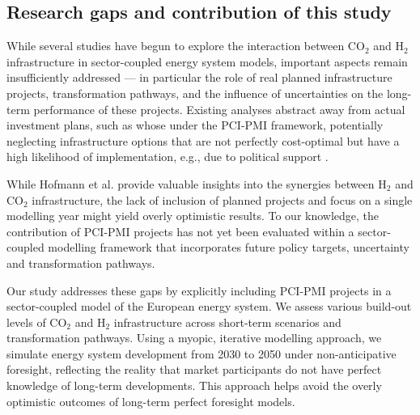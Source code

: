 \documentclass[pdflatex,sn-nature]{sn-jnl}%
\theoremstyle{thmstyleone}%
\theoremstyle{thmstyletwo}%
\theoremstyle{thmstylethree}%
\begin{document}
\subsection{Research gaps and contribution of this study}\label{sec:research_gaps_contribution}
While several studies have begun to explore the interaction between CO$_2$ and H$_2$ infrastructure in sector-coupled energy system models, important aspects remain insufficiently addressed --- in particular the role of real planned infrastructure projects, transformation pathways, and the influence of uncertainties on the long-term performance of these projects. Existing analyses abstract away from actual investment plans, such as whose under the PCI-PMI framework, potentially neglecting infrastructure options that are not perfectly cost-optimal but have a high likelihood of implementation, e.g., due to political support \cite{greevenbroekLittleLoseCase2024,trutnevyteDoesCostOptimization2016}. 

While Hofmann et al. \cite{hofmannH2CO2Network2025} provide valuable insights into the synergies between H$_2$ and CO$_2$ infrastructure, the lack of inclusion of planned projects and focus on a single modelling year might yield overly optimistic results. To our knowledge, the contribution of PCI-PMI projects has not yet been evaluated within a sector-coupled modelling framework that incorporates future policy targets, uncertainty and transformation pathways.

Our study addresses these gaps by explicitly including PCI-PMI projects in a sector-coupled model of the European energy system. We assess various build-out levels of CO$_2$ and H$_2$ infrastructure across short-term scenarios and transformation pathways. Using a myopic, iterative modelling approach, we simulate energy system development from 2030 to 2050 under non-anticipative foresight, reflecting the reality that market participants do not have perfect knowledge of long-term developments. This approach helps avoid the overly optimistic outcomes of long-term perfect foresight models.
\end{document}
